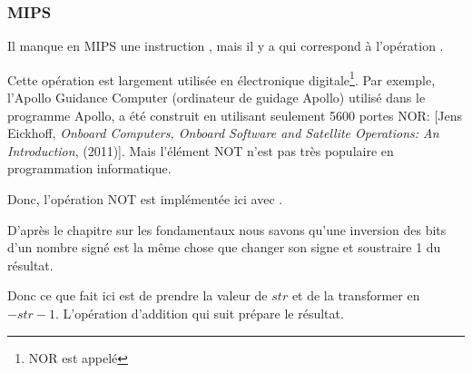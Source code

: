 ﻿\subsubsection{MIPS}




Il manque en MIPS une instruction \NOT, mais il y a \NOR qui correspond à l'opération
.

Cette opération est largement utilisée en électronique digitale\footnote{NOR est
appelé }.
Par exemple, l'Apollo Guidance Computer (ordinateur de guidage Apollo) utilisé dans
le programme Apollo, a été construit en utilisant seulement 5600 portes NOR:
[Jens Eickhoff, \emph{Onboard Computers, Onboard Software and Satellite Operations: An Introduction}, (2011)].
Mais l'élément NOT n'est pas très populaire en programmation informatique.

Donc, l'opération NOT est implémentée ici avec .

D'après le chapitre sur les fondamentaux  nous savons qu'une
inversion des bits d'un nombre signé est la même chose que changer son signe et soustraire
1 du résultat.

Donc ce que \NOT fait ici est de prendre la valeur de $str$ et de la transformer
en $-str-1$.
L'opération d'addition qui suit prépare le résultat.
